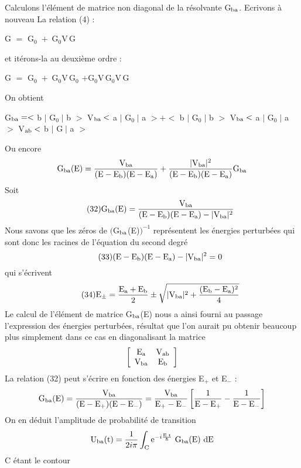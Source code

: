 Calculons l'élément de matrice non diagonal de la résolvante G$_{\text{ba}}$.
Ecrivons à nouveau La relation (4) :
\begin{center}
G $=$ G$_0\;+\;$G$_0$V\,G
\end{center}
et itérons-la au deuxième ordre :
\begin{center}
G $=$ G$_0\;+\;$G$_0$V\,G$_0$ $+$G$_0$V\,G$_0$V\,G
\end{center}
On obtient
\begin{center}
G$_{\text{ba}}=<$ b $|$ G$_0\;|$ b $>$ V$_{\text{ba}}<$ a $|$ G$_0\;|$ a $>+<$
 b $|$ G$_0\;|$ b $>$ V$_{\text{ba}}<$ a $|$ G$_0\;|$ a $>$ V$_{\text{ab}}<$ b $|$ G$\;|$ a $>$
\end{center}
Ou encore
\[
\text{G}_{\text{ba}}(\text{E})=\frac{\text{V}_{\text{ba}}}{(\text{E}-\text{E}_{\text{b}})(\text{E}-\text{E}_{\text{a}})}+
\frac{|\text{V}_{\text{ba}}|^2}{(\text{E}-\text{E}_{\text{b}})(\text{E}-\text{E}_{\text{a}})}\text{G}_{\text{ba}}
\]
Soit
\[
\tag{32}\text{G}_{\text{ba}}(\text{E})=
\frac{\text{V}_{\text{ba}}}{(\text{E}-\text{E}_{\text{b}})(\text{E}-\text{E}_{\text{a}})-|\text{V}_{\text{ba}}|^2}
\]
Nous savons que les zéros de $\big($G$_{\text{ba}}$(E)$\big)^{-1}$ représentent les énergies perturbées
qui sont donc les racines de l'équation du second degré
\[
\tag{33}(\text{E}-\text{E}_{\text{b}})(\text{E}-\text{E}_{\text{a}})-|\text{V}_{\text{ba}}|^2=0
\]
qui s'écrivent
\[
\tag{34}\text{E}_\pm=\frac{\text{E}_{\text{a}}+\text{E}_{\text{b}}}{2}\pm
\sqrt{|\text{V}_{\text{ba}}|^2+\frac{(\text{E}_{\text{b}}-\text{E}_{\text{a}})^2}{4}}
\]
Le calcul de l'élément de matrice G$_{\text{ba}}$(E) nous a ainsi fourni au passage l'expression
des énergies perturbées, résultat que l'on aurait pu obtenir beaucoup
plus simplement dans ce cas en diagonalisant la matrice
\[
\left[ \begin{array}{cc}
\text{E}_{\text{a}} & \text{V}_{\text{ab}} \\
\text{V}_{\text{ba}} & \text{E}_{\text{b}} \end{array} \right]
\]
La relation (32) peut s'écrire en fonction des énergies E$_+$ et E$_-$ :
\[
\text{G}_{\text{ba}}(\text{E})=
\frac{\text{V}_{\text{ba}}}{(\text{E}-\text{E}_+)(\text{E}-\text{E}_-)}=\frac{\text{V}_{\text{ba}}}{\text{E}_+-\text{E}_-}
\left[\frac{1}{\text{E}-\text{E}_+}-\frac{1}{\text{E}-\text{E}_-}\right]
\]
On en déduit l'amplitude de probabilité de transition
\[
\text{U}_{\text{ba}}\text{(t)}=\frac{1}{2i\pi}\int_{\text{C}}\text{e}^{-i\frac{\text{E t}}{\hbar}}\text{ G}_{\text{ba}}\text{(E) dE}
\]
C étant le contour
\begin{center} 
\end{center}
